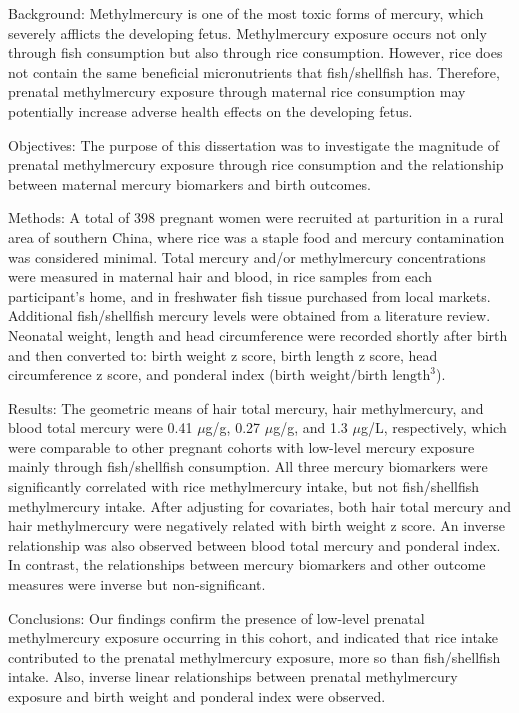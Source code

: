 Background: Methylmercury is one of the most toxic forms of mercury, which severely afflicts the developing fetus. Methylmercury exposure occurs not only through fish consumption but also through rice consumption. However, rice does not contain the same beneficial micronutrients that fish/shellfish has. Therefore, prenatal methylmercury exposure through maternal rice consumption may potentially increase adverse health effects on the developing fetus. 

Objectives: The purpose of this dissertation was to investigate the magnitude of prenatal methylmercury exposure through rice consumption and the relationship between maternal mercury biomarkers and birth outcomes.

Methods: A total of 398 pregnant women were recruited at parturition in a rural area of southern China, where rice was a staple food and mercury contamination was considered minimal. Total mercury and/or methylmercury concentrations were measured in maternal hair and blood, in rice samples from each participant's home, and in freshwater fish tissue purchased from local markets. Additional fish/shellfish mercury levels were obtained from a literature review. Neonatal weight, length and head circumference were recorded shortly after birth and then converted to: birth weight z score, birth length z score, head circumference z score, and ponderal index (\(\text{birth weight} / \text{birth length}^{3}\)). 

Results: The geometric means of hair total mercury, hair methylmercury, and blood total mercury were 0.41 \({\mu}\)g/g, 0.27 \({\mu}\)g/g, and 1.3 \({\mu}\)g/L, respectively, which were comparable to other pregnant cohorts with low-level mercury exposure mainly through fish/shellfish consumption. All three mercury biomarkers were significantly correlated with rice methylmercury intake, but not fish/shellfish methylmercury intake. After adjusting for covariates, both hair total mercury and hair methylmercury were negatively related with birth weight z score. An inverse relationship was also observed between blood total mercury and ponderal index. In contrast, the relationships between mercury biomarkers and other outcome measures were inverse but non-significant.

Conclusions: Our findings confirm the presence of low-level prenatal methylmercury exposure occurring in this cohort, and indicated that rice intake contributed to the prenatal methylmercury exposure, more so than fish/shellfish intake. Also, inverse linear relationships between prenatal methylmercury exposure and birth weight and ponderal index were observed. 
